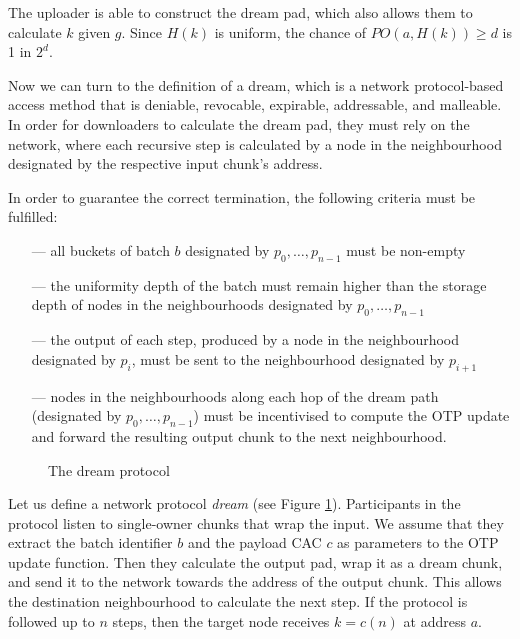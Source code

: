 The uploader is able to construct the dream pad, which also allows them to calculate $k$ given $g$. Since $\mathit{H}(k)$ is uniform, the chance of $\mathit{PO}(a,\mathit{H}(k))\geq d$ is 1 in $2^{d}$. 



Now we can turn to the definition of a dream, which is a network protocol-based access method that is deniable, revocable, expirable, addressable, and malleable. In order for downloaders to calculate the dream pad, they must rely on the network, where each recursive step is calculated by a node in the neighbourhood designated by the respective input chunk's address. 

In order to guarantee the correct termination, the following criteria must be fulfilled:
\begin{itemize}[noitemsep]
\item[---] all  buckets of batch $b$ designated by $p_0,\ldots, p_{n-1}$ must be non-empty
\item[---] the uniformity depth of the batch must remain higher than the storage depth of nodes in the neighbourhoods designated by $p_0, \ldots , p_{n-1}$
\item[---] the output of each step, produced by a node in the neighbourhood designated by $p_i$, must be sent to the 
neighbourhood designated by $p_{i+1}$ 
\item[---]  nodes in the neighbourhoods along each hop of the dream path (designated by $p_0,\ldots, p_{n-1}$) must be 
incentivised to compute the OTP update and forward the resulting output chunk to the next neighbourhood. \end{itemize}


\begin{figure}[htbp]
  \centering
  \caption{The dream protocol}
\label{fig:protocol}
\end{figure}


Let us  define a network protocol \emph{dream} (see Figure \ref{fig:protocol}). Participants in the protocol listen to single-owner chunks that wrap the input.
We assume that they extract the batch identifier $b$ and the payload CAC $c$ as parameters to the OTP update function. Then they calculate the output pad, wrap it as a dream chunk, and send it to the network towards the address of the output chunk. This allows the destination neighbourhood 
to calculate the next step. If the protocol is followed up to $n$ steps, then the target node receives $k=c(n)$ at address $a$. 


